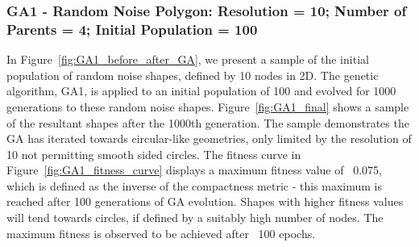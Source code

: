 \documentclass{article}
\begin{document}
\subsubsection*{GA1 - Random Noise Polygon: Resolution = 10; Number of Parents = 4; Initial Population = 100}

In Figure~\ref{fig:GA1_before_after_GA}, we present a sample of the initial population of random noise shapes, defined by 10 nodes in 2D. The genetic algorithm, GA1, is applied to an initial population of 100 and evolved for 1000 generations to these random noise shapes. Figure~\ref{fig:GA1_final} shows a sample of the resultant shapes after the 1000th generation. The sample demonstrates the GA has iterated towards circular-like geometries, only limited by the resolution of 10 not permitting smooth sided circles. The fitness curve in Figure~\ref{fig:GA1_fitness_curve} displays a maximum fitness value of ~0.075, which is defined as the inverse of the compactness metric - this maximum is reached after 100 generations of GA evolution. Shapes with higher fitness values will tend towards circles, if defined by a suitably high number of nodes. The maximum fitness is observed to be achieved after ~100 epochs.
\end{document}
